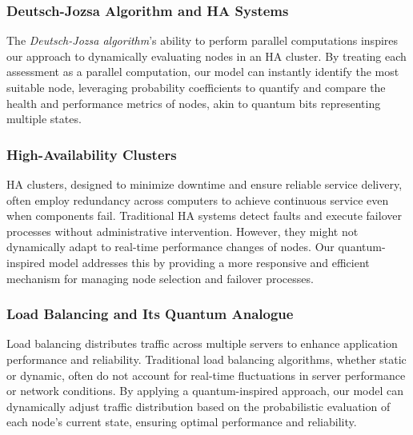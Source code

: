 \documentclass[12pt]{article}
\begin{document}
\subsubsection{Deutsch-Jozsa Algorithm and HA Systems}
The \textit{Deutsch-Jozsa algorithm}'s ability to perform parallel computations inspires our approach to dynamically evaluating nodes in an HA cluster. By treating each assessment as a parallel computation, our model can instantly identify the most suitable node, leveraging probability coefficients to quantify and compare the health and performance metrics of nodes, akin to quantum bits representing multiple states.

\subsubsection{High-Availability Clusters}
HA clusters, designed to minimize downtime and ensure reliable service delivery, often employ redundancy across computers to achieve continuous service even when components fail. Traditional HA systems detect faults and execute failover processes without administrative intervention. However, they might not dynamically adapt to real-time performance changes of nodes. Our quantum-inspired model addresses this by providing a more responsive and efficient mechanism for managing node selection and failover processes.

\subsubsection{Load Balancing and Its Quantum Analogue}
Load balancing distributes traffic across multiple servers to enhance application performance and reliability. Traditional load balancing algorithms, whether static or dynamic, often do not account for real-time fluctuations in server performance or network conditions. By applying a quantum-inspired approach, our model can dynamically adjust traffic distribution based on the probabilistic evaluation of each node's current state, ensuring optimal performance and reliability.
\end{document}
